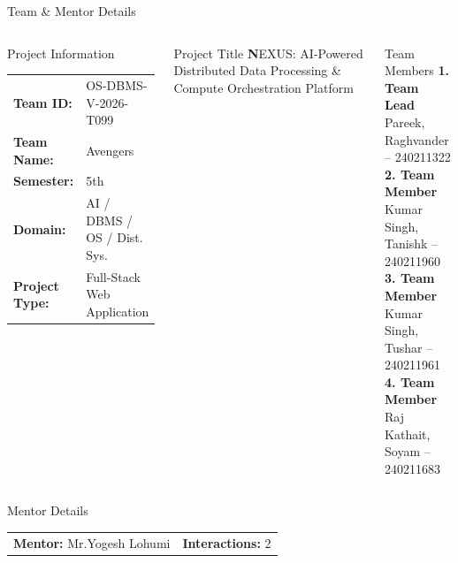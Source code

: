 \documentclass[aspectratio=169,11pt]{beamer}
\begin{document}
\begin{frame}{Team \& Mentor Details}

\begin{columns}[T,totalwidth=\textwidth]


\begin{block}{Project Information}
\small
\begin{tabular}{@{}ll@{}}
\textbf{Team ID:} & OS-DBMS-V-2026-T099 \\[0.5mm]
\textbf{Team Name:} & Avengers \\[0.5mm]
\textbf{Semester:} & 5th \\[0.5mm]
\textbf{Domain:} & AI / DBMS / OS / Dist. Sys. \\[0.5mm]
\textbf{Project Type:} & Full-Stack Web Application
\end{tabular}
\end{block}

\vspace{0.0mm}

\begin{block}{Project Title}
\small
\textbf
 NEXUS: AI-Powered Distributed Data Processing \& Compute Orchestration Platform
\end{block}


\begin{block}{Team Members}
\small
\textbf{1. Team Lead}\\
Pareek, Raghvander -- 240211322\\[1.5mm]
\textbf{2. Team Member}\\
Kumar Singh, Tanishk -- 240211960\\[1.5mm]
\textbf{3. Team Member}\\
Kumar Singh, Tushar -- 240211961\\[1.5mm]
\textbf{4. Team Member}\\
Raj Kathait, Soyam -- 240211683
\end{block}

\end{columns}

\vspace{1.5mm}

\begin{block}{Mentor Details}
\small
\begin{tabular}{@{}p{} r@{}}
\textbf{Mentor:} Mr.Yogesh Lohumi & \textbf{Interactions:} 2
\end{tabular}
\end{block}

\end{frame}
\end{document}
